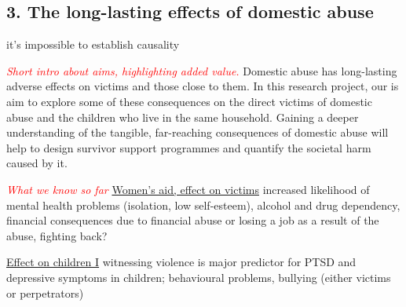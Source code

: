 \documentclass[11pt, a4paper]{article}
\begin{document}


%
%
%
%


\newpage

\subsection*{3. The long-lasting effects of domestic abuse}

it's impossible to establish causality

 \textcolor{red}{\textit{Short intro about aims, highlighting added value.}}
Domestic abuse has long-lasting adverse effects on victims and those close to them. In this research project, our is aim to explore some of these consequences on the direct victims of domestic abuse and the children who live in the same household. Gaining a deeper understanding of the tangible, far-reaching consequences of domestic abuse will help to design survivor support programmes and quantify the societal harm caused by it.


\textcolor{red}{\textit{What we know so far}}
\href{https://www.womensaid.org.uk/information-support/what-is-domestic-abuse/the-nature-and-impact-of-domestic-abuse/}{Women's aid, effect on victims} increased likelihood of mental health problems (isolation, low self-esteem), alcohol and drug dependency, financial consequences due to financial abuse or losing a job as a result of the abuse, fighting back?

\href{https://uksaysnomore.org/effects-of-domestic-abuse-on-children/}{Effect on children I} witnessing violence is major predictor for PTSD and depressive symptoms in children; behavioural problems, bullying (either victims or perpetrators)
\end{document}
